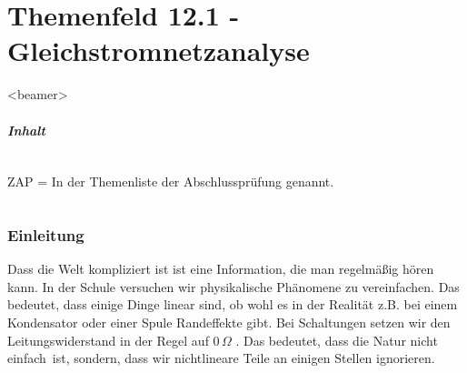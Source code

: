 \part{Themenfeld 12.1 - Gleichstromnetzanalyse}
\begin{frame}
  \partpage
\end{frame}
\begin{frame}<beamer>
  \frametitle{Inhalt}
  \begin{columns}
    \tableofcontents[sections={1-4},hidesubsections]%
    ZAP = In der Themenliste der Abschlussprüfung genannt.
    \tableofcontents[sections={5-},hidesubsections]%
  \end{columns}
\end{frame}

\section{Einleitung}
Dass die Welt kompliziert ist ist eine Information, die man regelmäßig hören kann. In der Schule versuchen wir physikalische Phänomene zu vereinfachen. Das bedeutet, dass einige Dinge linear sind, ob wohl es in der Realität z.B. bei einem Kondensator oder einer Spule Randeffekte gibt. Bei Schaltungen setzen wir den Leitungswiderstand in der Regel auf $0\, \Omega$ . Das bedeutet, dass die Natur nicht \glq einfach\grq \ ist, sondern, dass wir nichtlineare Teile an einigen Stellen ignorieren.


